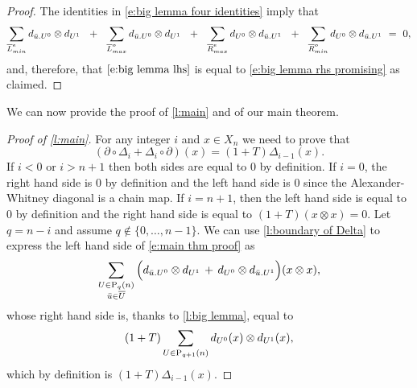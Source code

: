 \begin{proof}
	The identities in \eqref{e:big lemma four identities} imply that
	\begin{equation} \label{e:big lemma zero sum}
	\sum_{\overline{L}_{min}^{e}} d_{\bu.U^0} \otimes d_{U^1}\ \ +\ \
	\sum_{\overline{L}_{max}^{o}} d_{\bu.U^0} \otimes d_{U^1}\ \ +\ \
	\sum_{\overline{R}_{max}^{e}} d_{U^0} \otimes d_{\bu.U^1}\ \ +\ \ 
	\sum_{\overline{R}_{min}^{o}} d_{U^0} \otimes d_{\bu.U^1}\ =\ 0,
	\end{equation}
	and, therefore, that $\eqref{e:big lemma lhs}$ is equal to \eqref{e:big lemma rhs promising} as claimed.
\end{proof}

We can now provide the proof of \cref{l:main} and of our main theorem.

\begin{proof}[Proof of \cref{l:main}]
	For any integer $i$ and $x \in X_n$ we need to prove that
	\begin{equation} \label{e:main thm proof}
	(\partial \circ \Delta_{i} + \Delta_{i} \circ \partial)(x) = (1 + T) \Delta_{i-1}(x).
	\end{equation}
	If $i < 0$ or $i > n+1$ then both sides are equal to $0$ by definition.
	If $i = 0$, the right hand side is $0$ by definition and the left hand side is $0$ since the Alexander-Whitney diagonal is a chain map.
	If $i = n+1$, then the left hand side is equal to $0$ by definition and the right hand side is equal to $(1+T) (x \otimes x) = 0$.
	Let $q = n-i$ and assume $q \not\in \{0, \dots, n-1\}$.
	We can use \cref{l:boundary of Delta} to express the left hand side of \eqref{e:main thm proof} as
	\begin{equation*}
	\sum_{\substack{U \in \P_{q}(n) \\ \bu \in \overline{U}}} \Big( d_{\bu.U^0} \otimes d_{U^1} \, + \, d_{U^0} \otimes d_{\bu.U^1} \Big) (x \otimes x),
	\end{equation*}
	whose right hand side is, thanks to \cref{l:big lemma}, equal to
	\begin{equation*}
	(1+T) \sum_{U \in \P_{q+1}(n)} d_{U^0}(x) \otimes d_{U^1}(x),
	\end{equation*}
	which by definition is $(1+T)\Delta_{i-1}(x)$.
\end{proof}
